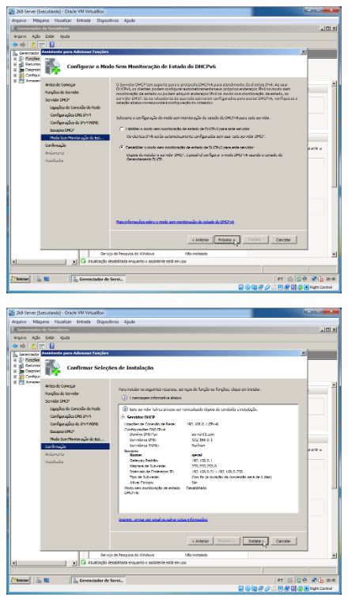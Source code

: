 \documentclass[10pt]{article}
\begin{document}
\begin{figure}[H]
    \centering
    \caption{}
    \label{fig:5317}
    \includegraphics[width=\linewidth]{images/windows_server/dhcp/014.png}
\end{figure}
\begin{figure}[H]
    \centering
    \caption{}
    \label{fig:5318}
    \includegraphics[width=\linewidth]{images/windows_server/dhcp/015.png}
\end{figure}
\end{document}
